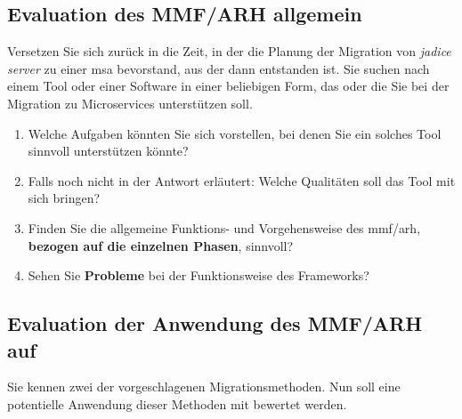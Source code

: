 \subsection{Evaluation des MMF/ARH all\-ge\-mein}

Versetzen Sie sich zurück in die Zeit, in der die Planung der Migration von \emph{jadice server} zu einer \acrlong{msa} bevorstand, aus der dann \jf entstanden ist.
Sie suchen nach einem Tool oder einer Software in einer beliebigen Form, das oder die Sie bei der Migration zu Microservices unterstützen soll.

\begin{enumerate}
	\item Welche Aufgaben könnten Sie sich vorstellen, bei denen Sie ein solches Tool sinnvoll unterstützen könnte?
	\item Falls noch nicht in der Antwort erläutert: Welche Qualitäten soll das Tool mit sich bringen?
	\item Finden Sie die allgemeine Funktions- und Vorgehensweise des \gls{mmf}/\gls{arh}, \textbf{bezogen auf die einzelnen Phasen}, sinnvoll?
	\item Sehen Sie \textbf{Probleme} bei der Funktionsweise des Frameworks?
\end{enumerate}

\subsection{Evaluation der Anwendung des MMF/ARH auf \jf}

Sie kennen zwei der vorgeschlagenen Migrationsmethoden.
Nun soll eine potentielle Anwendung dieser Methoden mit \jf bewertet werden.

